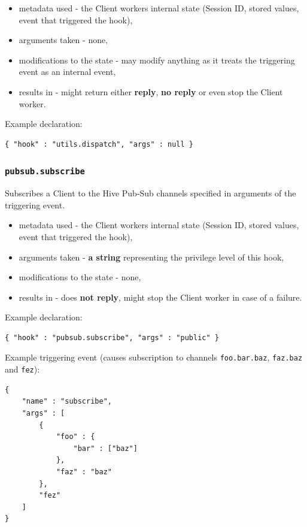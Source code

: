 \documentclass[a4paper]{article}
\begin{document}
\begin{itemize}
\item metadata used - the Client workers internal state (Session ID, stored values, event that triggered the hook),
\item arguments taken - none,
\item modifications to the state - may modify anything as it treats the triggering event as an internal event,
\item results in - might return either \textbf{reply}, \textbf{no reply} or even stop the Client worker.
\end{itemize}

\noindent
Example declaration:

\begin{verbatim}
{ "hook" : "utils.dispatch", "args" : null }
\end{verbatim}
\subsubsection{\texttt{pubsub.subscribe}}
\label{sec-9-2-4}
\label{ref-hook_pubsub}


Subscribes a Client to the Hive Pub-Sub channels specified in arguments of the triggering event.


\begin{itemize}
\item metadata used - the Client workers internal state (Session ID, stored values, event that triggered the hook),
\item arguments taken - \textbf{a string} representing the privilege level of this hook,
\item modifications to the state - none,
\item results in - does \textbf{not reply}, might stop the Client worker in case of a failure.
\end{itemize}

\noindent
Example declaration:

\begin{verbatim}
{ "hook" : "pubsub.subscribe", "args" : "public" }
\end{verbatim}




\noindent
Example triggering event (causes subscription to channels \texttt{foo.bar.baz}, \texttt{faz.baz} and \texttt{fez}):


\begin{verbatim}
{
    "name" : "subscribe",
    "args" : [
        {
            "foo" : {
                "bar" : ["baz"]
            },
            "faz" : "baz"
        },
        "fez"
    ]
}
\end{verbatim}
\end{document}
